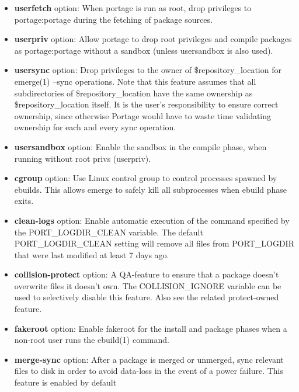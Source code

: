 \documentclass[10pt,a4paper]{article}
\begin{document}
\begin{enumerate}
\begin{enumerate}[label*=\arabic*.]
\begin{itemize}
\begin{itemize}[label={o}]
					\item \textbf{userfetch} option: When portage is run as root, drop privileges to portage:portage during the fetching of package sources.
					
					\item \textbf{userpriv} option: Allow portage to drop root privileges and compile packages as portage:portage without a sandbox (unless usersandbox is also used).
					
					\item \textbf{usersync} option: Drop privileges to the owner of \${repository\_location} for emerge(1) --sync operations. Note that this feature assumes that all subdirectories of \${repository\_location} have the same ownership as \${repository\_location} itself. It is the user's responsibility to ensure correct ownership, since otherwise Portage would have to waste time validating ownership for each and every sync operation.
					
					\item \textbf{usersandbox} option: Enable the sandbox in the compile phase, when running without root privs (userpriv). 
					
					\item \textbf{cgroup} option: Use Linux control group to control processes spawned by ebuilds. This allows emerge to safely kill all subprocesses when ebuild phase exits.
					
					\item \textbf{clean-logs} option: Enable automatic execution of the command specified by the PORT\_LOGDIR\_CLEAN variable. The default PORT\_LOGDIR\_CLEAN setting will remove all files from PORT\_LOGDIR that were last modified at least 7 days ago.
					
					\item \textbf{collision-protect} option: A QA-feature to ensure that a package doesn't overwrite files it doesn't own. The COLLISION\_IGNORE variable can be used to selectively disable this feature. Also see the related protect-owned feature.
					
					\item \textbf{fakeroot} option: Enable fakeroot for the install and package phases when a non-root user runs the ebuild(1) command.
					
					\item \textbf{merge-sync } option: After a package is merged or unmerged, sync relevant files to disk in order to avoid data-loss in the event of a power failure. This feature is enabled by default
					

\end{itemize}
\end{itemize}
\end{enumerate}
\end{enumerate}
\end{document}
